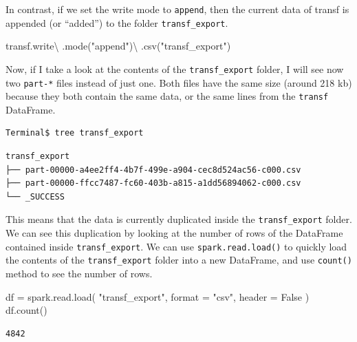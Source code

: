 \documentclass[
  11pt,
  letterpaper,
  DIV=11,
  numbers=noendperiod]{scrreprt}
\newenvironment{Shaded}{\begin{snugshade}}{\end{snugshade}}
\newcommand{\BuiltInTok}[1]{\textcolor[rgb]{0.00,0.23,0.31}{#1}}
\newcommand{\NormalTok}[1]{\textcolor[rgb]{0.00,0.23,0.31}{#1}}
\newcommand{\OperatorTok}[1]{\textcolor[rgb]{0.37,0.37,0.37}{#1}}
\newcommand{\StringTok}[1]{\textcolor[rgb]{0.13,0.47,0.30}{#1}}
\newcommand{\VariableTok}[1]{\textcolor[rgb]{0.07,0.07,0.07}{#1}}
\begin{document}
In contrast, if we set the write mode to \texttt{append}, then the
current data of transf is appended (or ``added'') to the folder
\texttt{transf\_export}.

\begin{Shaded}
\begin{Highlighting}[]
\NormalTok{transf.write}\OperatorTok{\textbackslash{}}
\NormalTok{    .mode(}\StringTok{"append"}\NormalTok{)}\OperatorTok{\textbackslash{}}
\NormalTok{    .csv(}\StringTok{"transf\_export"}\NormalTok{)}
\end{Highlighting}
\end{Shaded}

Now, if I take a look at the contents of the \texttt{transf\_export}
folder, I will see now two \texttt{part-*} files instead of just one.
Both files have the same size (around 218 kb) because they both contain
the same data, or the same lines from the \texttt{transf} DataFrame.

\begin{verbatim}
Terminal$ tree transf_export
\end{verbatim}

\begin{verbatim}
transf_export
├── part-00000-a4ee2ff4-4b7f-499e-a904-cec8d524ac56-c000.csv
├── part-00000-ffcc7487-fc60-403b-a815-a1dd56894062-c000.csv
└── _SUCCESS
\end{verbatim}

This means that the data is currently duplicated inside the
\texttt{transf\_export} folder. We can see this duplication by looking
at the number of rows of the DataFrame contained inside
\texttt{transf\_export}. We can use \texttt{spark.read.load()} to
quickly load the contents of the \texttt{transf\_export} folder into a
new DataFrame, and use \texttt{count()} method to see the number of
rows.

\begin{Shaded}
\begin{Highlighting}[]
\NormalTok{df }\OperatorTok{=}\NormalTok{ spark.read.load(}
    \StringTok{"transf\_export"}\NormalTok{,}
    \BuiltInTok{format} \OperatorTok{=} \StringTok{"csv"}\NormalTok{,}
\NormalTok{    header }\OperatorTok{=} \VariableTok{False}
\NormalTok{)}
\NormalTok{df.count()}
\end{Highlighting}
\end{Shaded}

\begin{verbatim}
4842
\end{verbatim}
\end{document}
